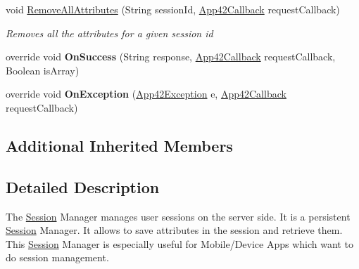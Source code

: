 \begin{DoxyCompactItemize}
void \hyperlink{classcom_1_1shephertz_1_1app42_1_1paas_1_1sdk_1_1windows_1_1session_1_1_session_service_a5357fb9548b4effa5744f9fe3add84b2}{Remove\+All\+Attributes} (String session\+Id, \hyperlink{interfacecom_1_1shephertz_1_1app42_1_1paas_1_1sdk_1_1windows_1_1_app42_callback}{App42\+Callback} request\+Callback)
\begin{DoxyCompactList}\small\item\em Removes all the attributes for a given session id \end{DoxyCompactList}\item 
\hypertarget{classcom_1_1shephertz_1_1app42_1_1paas_1_1sdk_1_1windows_1_1session_1_1_session_service_aa1a280d4374a8662d22a74cba81bb89c}{override void {\bfseries On\+Success} (String response, \hyperlink{interfacecom_1_1shephertz_1_1app42_1_1paas_1_1sdk_1_1windows_1_1_app42_callback}{App42\+Callback} request\+Callback, Boolean is\+Array)}\label{classcom_1_1shephertz_1_1app42_1_1paas_1_1sdk_1_1windows_1_1session_1_1_session_service_aa1a280d4374a8662d22a74cba81bb89c}

\item 
\hypertarget{classcom_1_1shephertz_1_1app42_1_1paas_1_1sdk_1_1windows_1_1session_1_1_session_service_a4d4f89ddc6340fa1fdfe89394c155f6a}{override void {\bfseries On\+Exception} (\hyperlink{classcom_1_1shephertz_1_1app42_1_1paas_1_1sdk_1_1windows_1_1_app42_exception}{App42\+Exception} e, \hyperlink{interfacecom_1_1shephertz_1_1app42_1_1paas_1_1sdk_1_1windows_1_1_app42_callback}{App42\+Callback} request\+Callback)}\label{classcom_1_1shephertz_1_1app42_1_1paas_1_1sdk_1_1windows_1_1session_1_1_session_service_a4d4f89ddc6340fa1fdfe89394c155f6a}

\end{DoxyCompactItemize}
\subsection*{Additional Inherited Members}


\subsection{Detailed Description}
The \hyperlink{classcom_1_1shephertz_1_1app42_1_1paas_1_1sdk_1_1windows_1_1session_1_1_session}{Session} Manager manages user sessions on the server side. It is a persistent \hyperlink{classcom_1_1shephertz_1_1app42_1_1paas_1_1sdk_1_1windows_1_1session_1_1_session}{Session} Manager. It allows to save attributes in the session and retrieve them. This \hyperlink{classcom_1_1shephertz_1_1app42_1_1paas_1_1sdk_1_1windows_1_1session_1_1_session}{Session} Manager is especially useful for Mobile/\+Device Apps which want to do session management. 

